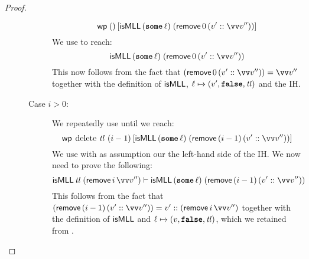 \documentclass[thesis.tex]{subfiles}
\begin{document}
\begin{proof}
\begin{description}
\begin{description}
\[                            \wpre{()}{\isMLL\, (\Some \loc)\; (\textlog{remove}\, 0\, (\val' :: \vect{\val}''))}
                        \]
                        We use  to reach:
                        \[
                            \isMLL\, (\Some \loc)\; (\textlog{remove}\, 0\, (\val' :: \vect{\val}''))
                        \]
                        This now follows from the fact that $(\textlog{remove}\, 0\, (\val' :: \vect{\val}'')) = \vect{\val}''$ together with the definition of $\textsf{\upshape isMLL}$, $\loc \fmapsto (\val', \False, \tl)$ and the IH.
                  \item[Case $i > 0$:] We repeatedly use  until we reach:
                        \[
                            \wpre{\MLLdelete\,\tl\ (\iindex - 1)}{\isMLL\, (\Some \loc)\; (\textlog{remove}\, (\iindex - 1)\, (\val' :: \vect{\val}''))}
                        \]
                        We use  with as assumption our the left-hand side of the IH. We now need to prove the following:
                        \[\isMLL\, \tl\; (\textlog{remove}\, \iindex\, \vect{\val}'') \proves \isMLL\, (\Some \loc)\; (\textlog{remove}\, (\iindex - 1)\, (\val' :: \vect{\val}''))\]
                        This follows from the fact that $(\textlog{remove}\, (\iindex - 1)\, (\val' :: \vect{\val}'')) = \val' :: (\textlog{remove}\, \iindex\, \vect{\val}'')$ together with the definition of $\textsf{\upshape isMLL}$ and $\loc \fmapsto (\val, \False, \tl)$, which we retained from . \qedhere
              \end{description}
    \end{description}
\end{proof}
\end{document}
